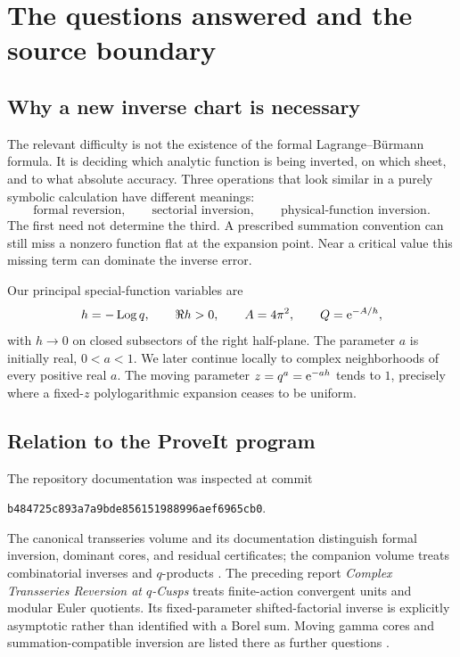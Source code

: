 \documentclass[11pt,a4paper]{article}
\numberwithin{equation}{section}
\theoremstyle{definition}
\theoremstyle{remark}\newtheorem{remark}[theorem]{Remark}
\newcommand{\Log}{\operatorname{Log}}\newcommand{\Li}{\operatorname{Li}}
\begin{document}
\section{The questions answered and the source boundary}
\label{sec:scope}

\subsection{Why a new inverse chart is necessary}
The relevant difficulty is not the existence of the formal
Lagrange--B\"urmann formula. It is deciding which analytic function is
being inverted, on which sheet, and to what absolute accuracy. Three
operations that look similar in a purely symbolic calculation have
different meanings:
\[
 \text{formal reversion},\qquad
 \text{sectorial inversion},\qquad
 \text{physical-function inversion}.
\]
The first need not determine the third. A prescribed summation convention
can still miss a nonzero function flat at the expansion point. Near a
critical value this missing term can dominate the inverse error.

Our principal special-function variables are
\begin{equation}\label{eq:basic-vars}
 h=-\Log q,\qquad \Re h>0,\qquad
 A=4\pi^2,\qquad Q=\e^{-A/h},
\end{equation}
with $h\to0$ on closed subsectors of the right half-plane. The parameter
$a$ is initially real, $0<a<1$. We later continue locally to complex
neighborhoods of every positive real $a$. The moving parameter
$z=q^a=\mathrm e^{-ah}$ tends to $1$, precisely where a fixed-$z$ polylogarithmic
expansion ceases to be uniform.

\subsection{Relation to the ProveIt program}
The repository documentation was inspected at commit
\begin{center}
\texttt{b484725c893a7a9bde856151988996aef6965cb0}.
\end{center}
The canonical transseries volume and its documentation distinguish
formal inversion, dominant cores, and residual certificates; the
companion volume treats combinatorial inverses and $q$-products
\cite{repo}. The preceding report \emph{Complex Transseries Reversion at
$q$-Cusps} treats finite-action convergent units and modular Euler
quotients. Its fixed-parameter shifted-factorial inverse is explicitly
asymptotic rather than identified with a Borel sum. Moving gamma cores
and summation-compatible inversion are listed there as further questions
\cite{prior}.
\end{document}
